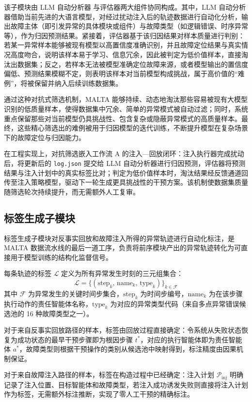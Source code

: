 该子模块由 LLM 自动分析器 与评估器两大组件协同构成。其中，LLM 自动分析器借助当前先进的大语言模型，对经过扰动注入后的轨迹数据进行自动化分析，输出故障主体（即引发异常的具体模块或组件）与故障类型（如逻辑错误、时序异常等），作为归因预测结果。紧接着，评估器基于该归因结果对样本质量进行判别：若某一异常样本能够被现有模型以高置信度准确识别，并且故障定位结果与真实情况高度吻合，说明该样本易于学习、信息冗余，因此被判定为低价值样本，直接淘汰出数据集；反之，若样本无法被模型准确定位故障来源，或者模型输出的置信度偏低、预测结果模糊不定，则表明该样本对当前模型构成挑战，属于高价值的“难例”，将被保留并纳入后续训练数据集。

通过这种对抗式筛选机制，MALTA 能够持续、动态地淘汰那些容易被现有大模型识别的低质量样本，使得数据集中冗余、简单的异常模式被自动过滤；同时，系统重点保留那些对当前模型仍具挑战性、包含复杂或隐蔽异常模式的高质量样本。最终，这些精心筛选出的难例被用于归因模型的迭代训练，不断提升模型在复杂场景下的故障定位与归因能力。

在工程实现上，对抗筛选嵌入工作流 A 的注入—回放闭环：注入执行器完成扰动后，将更新后的 \texttt{log.json} 提交给 LLM 自动分析器进行归因预测，评估器将预测结果与注入计划中的真实标签比对；判定为低价值样本时，淘汰结果经反馈通道回传至注入策略模型，驱动下一轮生成更具挑战性的干预方案。该机制使数据集质量随筛选轮次持续提升，而无需额外人工复审。

\subsection{标签生成子模块}
标签生成子模块对反事实回放和故障注入所得的异常轨迹进行自动化标注，是 MALTA 数据流水线的最后一道工序，负责将前序模块产出的异常轨迹转化为可直接用于模型训练的结构化监督信号。
 
每条轨迹的标签 $\mathcal{L}$ 定义为所有异常发生时刻的三元组集合：
\begin{equation}
  \mathcal{L} = \{(\mathrm{step}_k,\, \mathrm{name}_k,\, \text{type}_k)\}_{k \in \mathcal{F}}
\end{equation}
其中 $\mathcal{F}$ 为异常发生的关键时间步集合，$\mathrm{step}_k$ 为时间步编号，$\mathrm{name}_k$ 为在该步骤执行动作的责任智能体名称，$\text{type}_k$ 为对应的异常类型代码（来自多点异常错误候选池的 16 种故障类型之一）。
 
对于来自反事实回放路径的样本，标签由回放过程直接确定：令系统从失败状态恢复为成功状态的最早干预步骤即为根因步骤 $t^*$，对应的执行智能体即为责任智能体 $a^*$，故障类型则根据干预操作的类别从候选池中映射得到，标注精度由因果机制保证。
 
对于来自故障注入路径的样本，标签在构造过程中已经确定：注入计划 $\mathcal{P}_{\text{inj}}$ 明确记录了注入位置、目标智能体和故障类型，若注入成功诱发失败则直接将注入计划作为标签，无需额外标注推断，实现了零人工干预的精确标注。


